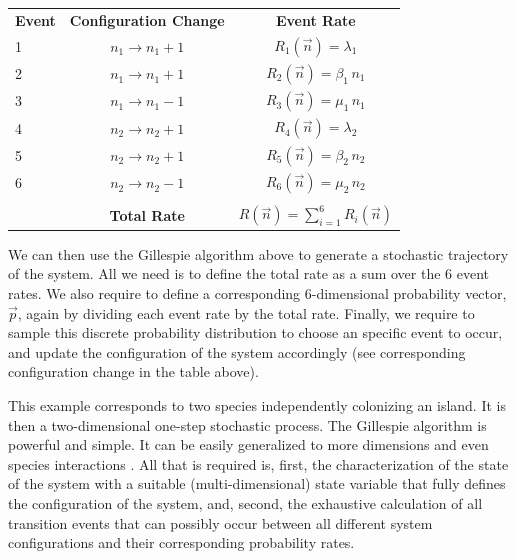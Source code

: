 \documentclass{article}
\begin{document}
\begin{center}
	\begin{tabular}{lcc}
		\textbf{Event} & \textbf{Configuration Change} & \textbf{Event Rate}                                                               \\
		
		1      & $n_1 \rightarrow n_1 + 1$ & $R_1(\vec{n}) = \lambda_1$              \\
		2      & $n_1 \rightarrow n_1 + 1$ & $R_2(\vec{n}) = \beta_1\,n_1$           \\
		3      & $n_1 \rightarrow n_1 - 1$ & $R_3(\vec{n}) = \mu_1\,n_1$             \\
		4      & $n_2 \rightarrow n_2 + 1$ & $R_4(\vec{n}) = \lambda_2$              \\
		5      & $n_2 \rightarrow n_2 + 1$ & $R_5(\vec{n}) = \beta_2\,n_2$           \\
		6      & $n_2 \rightarrow n_2 - 1$ & $R_6(\vec{n}) = \mu_2\,n_2$             \\
		       &                           &                                         \\
		       & \textbf{Total Rate}       & $R(\vec{n}) = \sum_{i=1}^6 R_i(\vec{n})$
	\end{tabular}
\end{center}
We can then use the Gillespie algorithm above to generate a stochastic trajectory of the system. All we need is to define the total rate as a sum over the 6 event rates. We also require to define a corresponding 6-dimensional probability vector, $\vec{p}$, again by dividing each event rate by the total rate. Finally, we require to sample this discrete probability distribution to choose an specific event to occur, and update the configuration of the system accordingly (see corresponding configuration change in the table above).  
\smallskip

This example corresponds to two species independently colonizing an island. It is then a two-dimensional one-step stochastic process. The Gillespie algorithm is powerful and simple. It can be easily generalized to more dimensions and even species interactions \citep{Sole02}. All that is required is, first, the characterization of the state of the system with a suitable (multi-dimensional) state variable that fully defines the configuration of the system, and, second, the exhaustive calculation of all transition events that can possibly occur between all different system configurations and their corresponding probability rates.  
\end{document}
